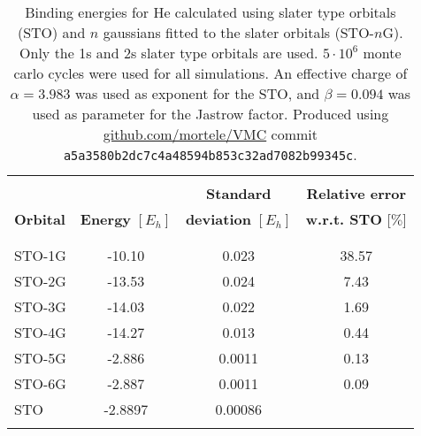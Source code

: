 \documentclass[a4paper]{article}
\newcommand{\e}[1]{\cdot10^{#1}}
\begin{document}
\begin{table}
\centering{}
\setlength\extrarowheight{2pt}
\begin{tabularx}{\textwidth}{X *{3}{S[table-format=-1.3,table-space-text-post=***]}}
\hline
\hline
\\[-0.9em]
                 &                          & \textbf{Standard}          & \textbf{Relative error}    \\
\textbf{Orbital} & \textbf{Energy} $[E_h]$  & \textbf{deviation} $[E_h]$ & \textbf{w.r.t. STO} [$\%$]  \\
\\[-0.9em]
\hline
\\[-0.9em]
STO-1G & -10.10  & 0.023  &  38.57 \\
STO-2G & -13.53  & 0.024  &   7.43 \\
STO-3G & -14.03  & 0.022  &   1.69 \\
STO-4G & -14.27  & 0.013  &   0.44 \\
STO-5G & -2.886  & 0.0011  &   0.13 \\
STO-6G & -2.887  & 0.0011  &   0.09 \\
STO    & -2.8897 & 0.00086 & \\
\\[-0.9em]
\hline
\end{tabularx}
\caption{Binding energies for He calculated using slater type orbitals (STO) and $n$ gaussians fitted to the slater orbitals (STO-$n$G). Only the 1s and 2s slater type orbitals are used. $5\e{6}$ monte carlo cycles were used for all simulations. An effective charge of $\alpha=3.983$ was used as exponent for the STO, and $\beta=0.094$ was used as parameter for the Jastrow factor. Produced using \url{github.com/mortele/VMC} commit \texttt{a5a3580b2dc7c4a48594b853c32ad7082b99345c}. \label{tab:vmcv2}}
\end{table}
\end{document}
